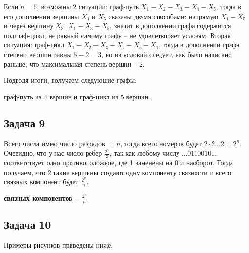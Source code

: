 \documentclass[a4paper,14pt]{article} %
\begin{document}
Если $n= 5$, возможны $2$ ситуации: граф-путь $X_1-X_2-X_3-X_4-X_5$, тогда в его дополнении вершины $X_1$ и $X_5$ связаны двумя способами: напрямую $X_1-X_5$ и через вершину $X_3$: $X_1-X_3-X_5$, значит в дополнении графа содержится подграф-цикл, не равный самому графу -- не удовлетворяет условям. Вторая ситуация: граф-цикл $X_1-X_2-X_3-X_4-X_5-X_1$, тогда в дополнении графа степени вершин равны $5-2=3$, но из условий следует, как было написано раньше, что максимальная степень вершин -- $2$.

Подводя итоги, получаем следующие графы:

\underline{граф-путь из $4$ вершин} и
\underline{ граф-цикл из $5$ вершин}.

\subsection{Задача 9}

Всего числа имею число разрядов $ = n$, тогда всего номеров будет $2\cdot 2\dots 2 =2^n$. Очевидно, что у нас число ребер $\frac{2^n}{2}$, так как любому числу $\dots 0110010\dots $ соответствует одно противоположное, где 1 заменены на 0 и наоборот. Тогда получаем, что 2 такие вершины создают одну компоненту связности и всего связных компонент будет  $\frac{2^n}{n}$.


\begin{flushright}
\begin{large}
\textbf {связных компонентов -- $\frac{2^n}{n}$}
\end{large}
\end{flushright}


\newpage
\begin{center}
\subsection{Задача 10}
\end{center}

Примеры рисунков приведены ниже.
\end{document}
